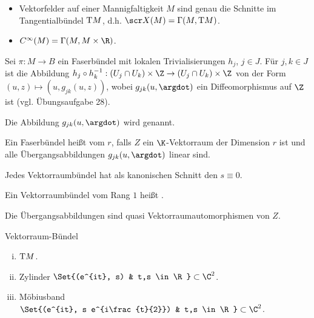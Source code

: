 \begin{ex*}
    \begin{itemize}
        \item
            Vektorfelder auf einer Mannigfaltigkeit $M$ sind genau die Schnitte im Tangentialbündel $\mathrm{T} M$, d.h. $\scr X(M) = \Gamma(M, \T M)$.
        \item
            $C^\infty(M) = \Gamma(M, M \times \R)$.
    \end{itemize}
\end{ex*}

\begin{nt} \label{5.5}
    Sei $\pi: M \to B$ ein Faserbündel mit lokalen Trivialisierungen $h_j$, $j \in J$.
    Für $j, k \in J$ ist die Abbildung
    \begin{math}
        h_j \circ h_k^{-1}: (U_j \cap U_k) \times \Z \to (U_j \cap U_k) \times \Z
    \end{math}
    von der Form $(u, z) \mapsto (u, g_{jk}(u,z))$, wobei $g_{jk}(u,\argdot)$ ein Diffeomorphismus auf $\Z$ ist (vgl. Übungsaufgabe 28).

    Die Abbildung $g_{jk}(u, \argdot)$ wird  genannt.
\end{nt}

\begin{df} \label{5.6}
    Ein Faserbündel heißt  vom  $r$, falls $Z$ ein $\K$-Vektorraum der Dimension $r$ ist und alle Übergangsabbildungen $g_{jk}(u, \argdot)$ linear sind.

    Jedes Vektorraumbündel hat als kanonischen Schnitt den  $s \equiv 0$.

    Ein Vektorraumbündel vom Rang $1$ heißt .
    \begin{note}
        Die Übergangsabbildungen sind quasi Vektorraumautomorphismen von $Z$.
    \end{note}
\end{df}

\begin{ex}
    Vektorraum-Bündel
    \begin{enumerate}[(i)]
        \item
            $\mathrm{T} M$.
        \item
            Zylinder $\Set{(e^{it}, s) & t,s \in \R} \subset \C^2$.
        \item
            Möbiusband $\Set{(e^{it}, s e^{i\frac{t}{2}}) & t,s \in \R} \subset \C^2$.
    \end{enumerate}
\end{ex}
